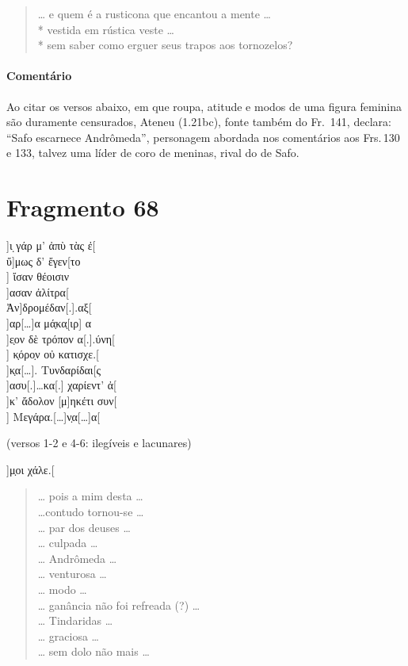 {\begin{verse}
\ldots{} e quem é a rusticona que encantou a mente \ldots{}\\*
vestida em rústica veste \ldots{}\\*
sem saber como erguer seus trapos aos tornozelos?
\end{verse}

{\paragraph{Comentário} Ao citar os versos abaixo, em que roupa, atitude e modos de uma figura feminina são
duramente censurados, Ateneu (1.21bc), fonte também do Fr.~141, declara: ``Safo
escarnece Andrômeda”, personagem abordada nos comentários aos Frs.\,130 e 133, talvez uma líder de coro de meninas, rival do de Safo.}


\pagebreak
\section{Fragmento 68} 

\begin{gkverse}
]ι ̣γάρ μ’ ἀπὺ τὰς ἐ[\\
ὔ]μως δ’ ἔγεν[το\\
   ] ἴσαν θέοισιν\\
 ]ασαν ἀλίτρα[\\
        Ἀν]δρομέδαν[.].αξ[\\
   ]αρ[\ldots{}]α μά̣κα̣[ιρ] α\\
 ]ε̣ον δὲ τρόπον α[.].ύνη[\\
      ] κ̣όρο̣ν οὐ κατισχε.[\\
]κ̣α[\ldots{}]. Τυνδαρίδαι[ς\\
]ασυ[.]\ldots{}κα[.] χαρίεντ’ ἀ[\\
]κ’ ἄδολον [μ]ηκέτι συν[\\
] Μεγάρα.[\ldots{}]ν̣α[\ldots{}]α[

\textnormal{(versos 1-2 e 4-6: ilegíveis e lacunares)}

]μ̣οι χάλε.[
\end{gkverse}

\begin{verse}
\ldots{} pois a mim desta \ldots{}\\
\ldots{}contudo tornou-se \ldots{}\\
\ldots{} par dos deuses \ldots{}\\
\ldots{} culpada \ldots{}\\
\ldots{} Andrômeda \ldots{}\\
\ldots{} venturosa \ldots{}\\
\ldots{} modo \ldots{}\\
\ldots{} ganância não foi refreada (?) \ldots{}\\
\ldots{} Tindaridas \ldots{}\\
\ldots{} graciosa \ldots{}\\
\ldots{} sem dolo não mais \ldots{}


\end{verse}}
